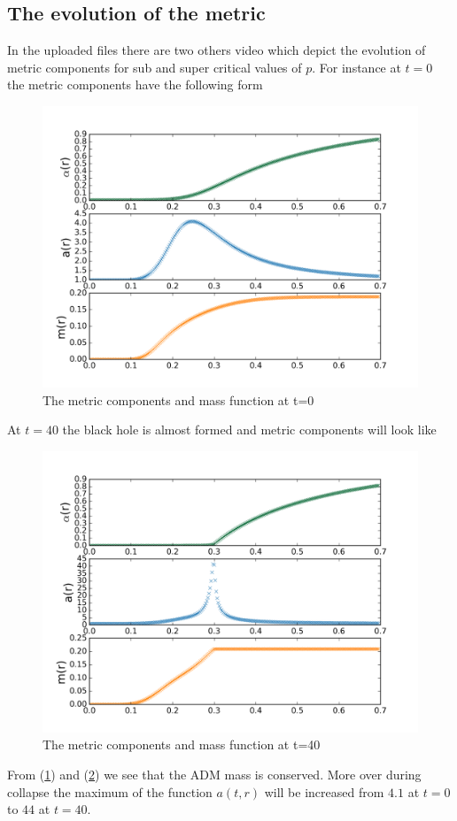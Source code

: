 \documentclass[a4paper,11pt]{article}
\begin{document}
\subsection{The evolution of the metric}
In the uploaded files there are two others video which depict the evolution of metric components for sub and super critical values of $p$. For instance at $t=0$ the metric components have the following form
\begin{figure}[H]
	\centering
	\includegraphics[width=\textwidth]{alog000}
	\caption{The metric components and mass function at t=0\label{fig2}}
\end{figure}
At $t=40$ the black hole is almost formed and  metric components will look like 
\begin{figure}[H]
	\centering
	\includegraphics[width=\textwidth]{alog079}
	\caption{The metric components and mass function at t=40\label{fig3}}
\end{figure}
From (\ref{fig2}) and (\ref{fig3}) we see that the ADM mass is conserved. More over during collapse the maximum of the function $a(t,r)$ will be increased from $4.1$ at $t=0$ to $44$ at $t=40$. 
\end{document}
